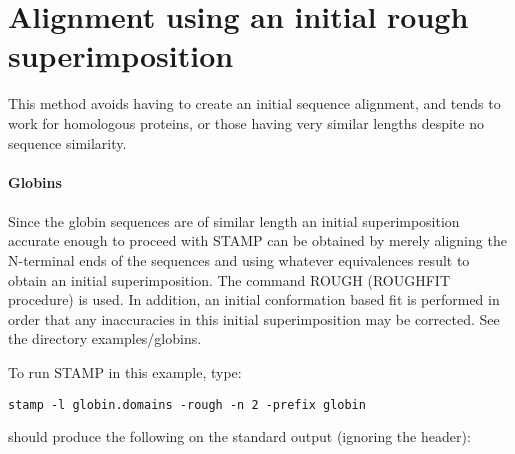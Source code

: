 \section{Alignment using an initial rough superimposition}

This method avoids having to create an initial sequence alignment, and 
tends to work for homologous proteins, or those having very similar 
lengths despite no sequence similarity.\\
\\
{\bf Globins}\\
\\
Since the globin sequences are of similar length an initial
superimposition accurate enough to proceed with STAMP can be
obtained by merely aligning the N-terminal ends of the sequences
and using whatever equivalences result to obtain an initial 
superimposition.  The command ROUGH (ROUGHFIT procedure) is used.  In addition,
an initial conformation based fit is performed 
in order that any inaccuracies in this initial superimposition may be corrected.  
See the directory examples/globins.

To run STAMP in this example, type:

\begin{scriptsize}\begin{verbatim}
stamp -l globin.domains -rough -n 2 -prefix globin 
\end{verbatim} \end{scriptsize}

should produce the following on the standard output (ignoring the header):\\

